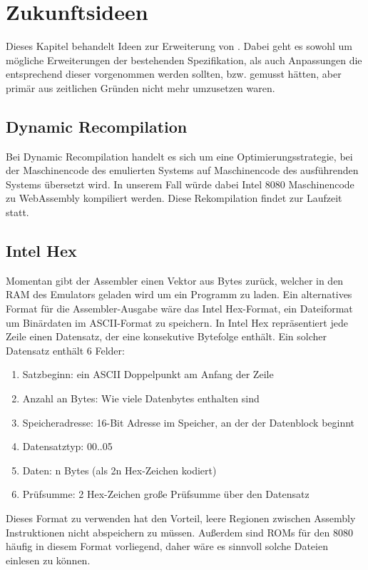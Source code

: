 \chapter{Zukunftsideen}

Dieses Kapitel behandelt Ideen zur Erweiterung von \Emu. Dabei geht es sowohl um mögliche Erweiterungen der bestehenden Spezifikation, als auch Anpassungen die entsprechend dieser vorgenommen werden sollten, bzw. gemusst hätten, aber primär aus zeitlichen Gründen nicht mehr umzusetzen waren.

\section{Dynamic Recompilation}

Bei Dynamic Recompilation handelt es sich um eine Optimierungsstrategie, bei der Maschinencode des emulierten Systems auf Maschinencode des ausführenden Systems übersetzt wird. In unserem Fall würde dabei Intel 8080 Maschinencode zu WebAssembly kompiliert werden. Diese Rekompilation findet zur Laufzeit statt.


\section{Intel Hex}

Momentan gibt der Assembler einen Vektor aus Bytes zurück, welcher in den RAM des Emulators geladen wird um ein Programm zu laden. Ein alternatives Format für die Assembler-Ausgabe wäre das Intel Hex-Format, ein Dateiformat um Binärdaten im ASCII-Format zu speichern. In Intel Hex repräsentiert jede Zeile einen Datensatz, der eine konsekutive Bytefolge enthält. Ein solcher Datensatz enthält 6 Felder:

\begin{enumerate}
\item Satzbeginn: ein ASCII Doppelpunkt am Anfang der Zeile
\item Anzahl an Bytes: Wie viele Datenbytes enthalten sind
\item Speicheradresse: 16-Bit Adresse im Speicher, an der der Datenblock beginnt
\item Datensatztyp: 00..05
\item Daten: n Bytes (als 2n Hex-Zeichen kodiert)
\item Prüfsumme: 2 Hex-Zeichen große Prüfsumme über den Datensatz
\end{enumerate}

Dieses Format zu verwenden hat den Vorteil, leere Regionen zwischen Assembly Instruktionen nicht abspeichern zu müssen. Außerdem sind ROMs für den 8080 häufig in diesem Format vorliegend, daher wäre es sinnvoll solche Dateien einlesen zu können.


